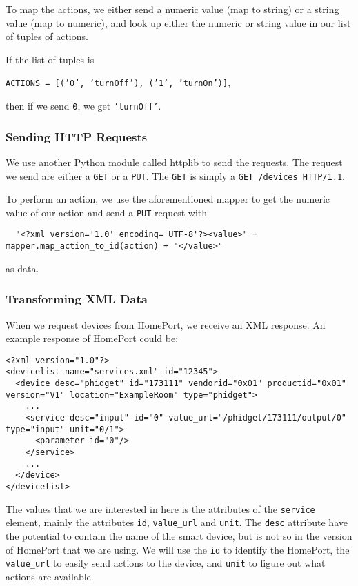 To map the actions, we either send a numeric value (map to string) or a string value (map to numeric), 
and look up either the numeric or string value in our list of tuples of actions.

If the list of tuples is
\begin{center}
  \texttt{ACTIONS = [('0', 'turnOff'), ('1', 'turnOn')]},
\end{center}
then if we send \texttt{0}, we get \texttt{'turnOff'}. 

\subsubsection{Sending HTTP Requests}
We use another Python module called httplib to send the requests. 
The request we send are either a \texttt{GET} or a \texttt{PUT}. 
The \texttt{GET} is simply a \texttt{GET /devices HTTP/1.1}. 

To perform an action, we use the aforementioned mapper to get the numeric value of our action and send a \texttt{PUT} request with 
  \begin{verbatim}
  "<?xml version='1.0' encoding='UTF-8'?><value>" + mapper.map_action_to_id(action) + "</value>"
  \end{verbatim}
as data. 

\subsubsection{Transforming XML Data}
When we request devices from HomePort, 
we receive an XML response. 
An example response of HomePort could be:
\begin{verbatim}
<?xml version="1.0"?>
<devicelist name="services.xml" id="12345">
  <device desc="phidget" id="173111" vendorid="0x01" productid="0x01" version="V1" location="ExampleRoom" type="phidget">
    ...
    <service desc="input" id="0" value_url="/phidget/173111/output/0" type="input" unit="0/1">
      <parameter id="0"/>
    </service>
    ...
  </device>
</devicelist>
\end{verbatim}

The values that we are interested in here is the attributes of the \texttt{service} element, 
mainly the attributes \texttt{id}, \texttt{value\_url} and \texttt{unit}. 
The \texttt{desc} attribute have the potential to contain the name of the smart device, 
but is not so in the version of HomePort that we are using. 
We will use the \texttt{id} to identify the HomePort, 
the \texttt{value\_url} to easily send actions to the device, 
and \texttt{unit} to figure out what actions are available. 

